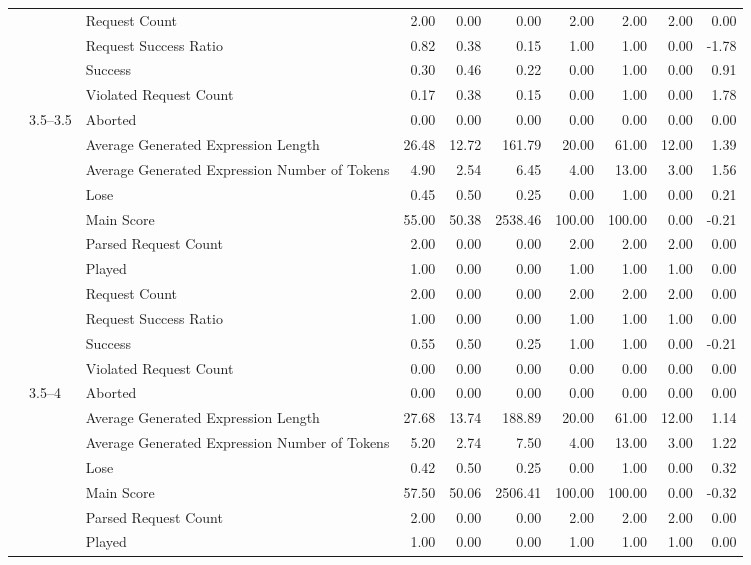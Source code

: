 \begin{tabular}{lllrrrrrrr}
 &  & Request Count & 2.00 & 0.00 & 0.00 & 2.00 & 2.00 & 2.00 & 0.00 \\
 &  & Request Success Ratio & 0.82 & 0.38 & 0.15 & 1.00 & 1.00 & 0.00 & -1.78 \\
 &  & Success & 0.30 & 0.46 & 0.22 & 0.00 & 1.00 & 0.00 & 0.91 \\
 &  & Violated Request Count & 0.17 & 0.38 & 0.15 & 0.00 & 1.00 & 0.00 & 1.78 \\
\cline{2-10}
 & \multirow[t]{11}{*}{3.5--3.5} & Aborted & 0.00 & 0.00 & 0.00 & 0.00 & 0.00 & 0.00 & 0.00 \\
 &  & Average Generated Expression Length & 26.48 & 12.72 & 161.79 & 20.00 & 61.00 & 12.00 & 1.39 \\
 &  & Average Generated Expression Number of Tokens & 4.90 & 2.54 & 6.45 & 4.00 & 13.00 & 3.00 & 1.56 \\
 &  & Lose & 0.45 & 0.50 & 0.25 & 0.00 & 1.00 & 0.00 & 0.21 \\
 &  & Main Score & 55.00 & 50.38 & 2538.46 & 100.00 & 100.00 & 0.00 & -0.21 \\
 &  & Parsed Request Count & 2.00 & 0.00 & 0.00 & 2.00 & 2.00 & 2.00 & 0.00 \\
 &  & Played & 1.00 & 0.00 & 0.00 & 1.00 & 1.00 & 1.00 & 0.00 \\
 &  & Request Count & 2.00 & 0.00 & 0.00 & 2.00 & 2.00 & 2.00 & 0.00 \\
 &  & Request Success Ratio & 1.00 & 0.00 & 0.00 & 1.00 & 1.00 & 1.00 & 0.00 \\
 &  & Success & 0.55 & 0.50 & 0.25 & 1.00 & 1.00 & 0.00 & -0.21 \\
 &  & Violated Request Count & 0.00 & 0.00 & 0.00 & 0.00 & 0.00 & 0.00 & 0.00 \\
\cline{2-10}
 & \multirow[t]{11}{*}{3.5--4} & Aborted & 0.00 & 0.00 & 0.00 & 0.00 & 0.00 & 0.00 & 0.00 \\
 &  & Average Generated Expression Length & 27.68 & 13.74 & 188.89 & 20.00 & 61.00 & 12.00 & 1.14 \\
 &  & Average Generated Expression Number of Tokens & 5.20 & 2.74 & 7.50 & 4.00 & 13.00 & 3.00 & 1.22 \\
 &  & Lose & 0.42 & 0.50 & 0.25 & 0.00 & 1.00 & 0.00 & 0.32 \\
 &  & Main Score & 57.50 & 50.06 & 2506.41 & 100.00 & 100.00 & 0.00 & -0.32 \\
 &  & Parsed Request Count & 2.00 & 0.00 & 0.00 & 2.00 & 2.00 & 2.00 & 0.00 \\
 &  & Played & 1.00 & 0.00 & 0.00 & 1.00 & 1.00 & 1.00 & 0.00 \\

\end{tabular}
